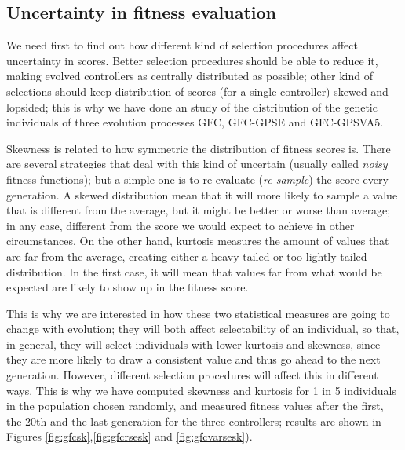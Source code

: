 \documentclass[10pt,journal,compsoc]{IEEEtran}
\begin{document}
\subsection{Uncertainty in fitness evaluation}

We need first to find out how different kind of selection procedures
affect uncertainty in scores. Better selection procedures should be
able to reduce it, making evolved controllers as centrally distributed
as possible; other kind of selections should keep distribution of
scores (for a single controller) skewed and lopsided; this is why we
have done an study of the distribution  of the genetic individuals of
three evolution processes {\sf GFC}, {\sf GFC-GPSE} and {\sf GFC-GPSVA5}. 


Skewness is related to how symmetric the distribution of fitness
scores is. There are several strategies that deal with this kind of
uncertain (usually called {\em noisy} fitness functions); but a simple
one is to re-evaluate ({\em re-sample}) the score every generation. A
skewed distribution mean that it will more likely to sample a value
that is different from the average, but it might be better or worse
than average; in any case, different from the score we would expect to
achieve in other circumstances. On the other hand, kurtosis measures
the amount of values that are far from the average, creating either a
heavy-tailed or too-lightly-tailed distribution. In the first case, it
will mean that values far from what would be expected are likely to
show up in the fitness score.

This is why we are interested in how these two statistical measures
are going to change with evolution; they will both affect
selectability of an individual, so that, in general, they will select
individuals with lower kurtosis and skewness, since they are more
likely to draw a consistent value and thus go ahead to the next
generation. However, different selection procedures will affect this
in different ways. This is why we have computed skewness and kurtosis for 1 in 5 individuals in the
population chosen randomly, and measured fitness values after the
first, the 20th and the last generation for the three controllers;
results are shown in Figures \ref{fig:gfcsk},\ref{fig:gfcrsesk} and
\ref{fig:gfcvarsesk}). %
\end{document}
